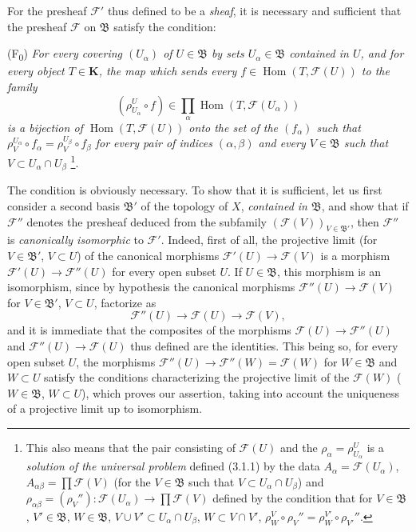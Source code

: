 \begin{env}[3.2.2]
\label{0.3.2.2}
For the presheaf $\mathcal{F}'$ thus defined to be a \emph{sheaf},
it is necessary and sufficient that the presheaf $\mathcal{F}$ on $\mathfrak{B}$
satisfy the condition:

\smallskip
\noindent
\textup{(F\textsubscript{0})} \emph{For every covering $(U_\alpha)$ of
$U\in\mathfrak{B}$ by sets $U_\alpha\in\mathfrak{B}$ contained in
$U$, and for every object $T\in\boldsymbol{K}$, the map which sends every
$f\in\operatorname{Hom}(T,\mathcal{F}(U))$ to the family
\[
  (\rho_{U_\alpha}^{U}\circ f)
  \in\prod_\alpha\operatorname{Hom}(T,\mathcal{F}(U_\alpha))
\]
is a bijection of $\operatorname{Hom}(T,\mathcal{F}(U))$ onto the set of the
$(f_\alpha)$ such that
$\rho_V^{U_\alpha}\circ f_\alpha=\rho_V^{U_\beta}\circ f_\beta$ for every
pair of indices $(\alpha,\beta)$ and every $V\in\mathfrak{B}$ such that
$V\subset U_\alpha\cap U_\beta$}%
\footnote{This also means that the pair consisting of $\mathcal{F}(U)$ and the
$\rho_\alpha=\rho_{U_\alpha}^{U}$ is a \emph{solution of the universal problem}
defined (3.1.1) by the data
$A_\alpha=\mathcal{F}(U_\alpha)$,
$A_{\alpha\beta}=\prod\mathcal{F}(V)$ (for the $V\in\mathfrak{B}$ such that
$V\subset U_\alpha\cap U_\beta$) and
$\rho_{\alpha\beta}=(\rho_V''):\mathcal{F}(U_\alpha)\to
\prod\mathcal{F}(V)$ defined by the condition that for
$V\in\mathfrak{B}$, $V'\in\mathfrak{B}$, $W\in\mathfrak{B}$,
$V\cup V'\subset U_\alpha\cap U_\beta$, $W\subset V\cap V'$,
$\rho_W^V\circ\rho_V''=\rho_W^{V'}\circ\rho_{V'}''$.}.

The condition is obviously necessary. To show that it is sufficient,
let us first consider a second basis $\mathfrak{B}'$ of the topology of $X$,
\emph{contained in $\mathfrak{B}$}, and show that if $\mathcal{F}''$
denotes the presheaf deduced from the subfamily
$(\mathcal{F}(V))_{V\in\mathfrak{B}'}$, then $\mathcal{F}''$ is
\emph{canonically isomorphic} to $\mathcal{F}'$. Indeed, first of all, the
projective limit (for $V\in\mathfrak{B}'$, $V\subset U$) of the canonical
morphisms $\mathcal{F}'(U)\to\mathcal{F}(V)$ is a morphism
$\mathcal{F}'(U)\to\mathcal{F}''(U)$ for every open subset $U$. If
$U\in\mathfrak{B}$, this morphism is an isomorphism, since by hypothesis the
canonical morphisms $\mathcal{F}''(U)\to\mathcal{F}(V)$ for
$V\in\mathfrak{B}'$, $V\subset U$, factorize as
\[
  \mathcal{F}''(U)\to\mathcal{F}(U)\to\mathcal{F}(V),
\]
and it is immediate that the composites of the morphisms
$\mathcal{F}(U)\to\mathcal{F}''(U)$ and
$\mathcal{F}''(U)\to\mathcal{F}(U)$ thus defined are the identities. This
being so, for every open subset $U$, the morphisms
$\mathcal{F}''(U)\to\mathcal{F}''(W)=\mathcal{F}(W)$ for
$W\in\mathfrak{B}$ and $W\subset U$ satisfy the conditions characterizing the
projective limit of the $\mathcal{F}(W)$ ($W\in\mathfrak{B}$, $W\subset U$), which
proves our assertion, taking into account the uniqueness of a projective limit
up to isomorphism.


\end{env}
